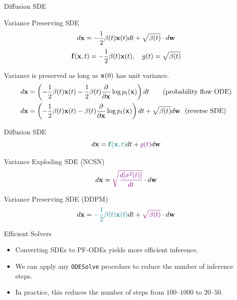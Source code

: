 \documentclass{beamer}
\begin{document}
\begin{frame}{Diffusion SDE}
	\begin{block}{Variance Preserving SDE}
		\vspace{-0.3cm}
		\[
			d \mathbf{x} = - \frac{1}{2} \beta(t) \mathbf{x}(t) dt + \sqrt{\beta(t)} \cdot d \mathbf{w}
		\]
		\[
			\mathbf{f}(\mathbf{x}, t) = - \frac{1}{2} \beta(t) \mathbf{x}(t) , \quad g(t) = \sqrt{\beta(t)} 
		\]
	\end{block}
	Variance is preserved as long as $\mathbf{x}(0)$ has unit variance.
	\begin{align*}
		d\mathbf{x} &= \left(- \frac{1}{2} \beta(t) \mathbf{x}(t) - \frac{1}{2} \beta(t) \frac{\partial}{\partial \mathbf{x}} \log p_t(\mathbf{x}) \right) dt \quad\quad \text{(probability flow ODE)} \\
		d\mathbf{x} &= \left(- \frac{1}{2} \beta(t) \mathbf{x}(t) - \beta(t) \frac{\partial}{\partial \mathbf{x}} \log p_t(\mathbf{x})\right) dt + \sqrt{\beta(t)} d \mathbf{w}\ \ \text{(reverse SDE)}
	\end{align*}
\end{frame}
\begin{frame}{Diffusion SDE}
	\vspace{-0.5cm}
	\[
		d\mathbf{x} = {\color{teal}\mathbf{f}(\mathbf{x}, t)} dt + {\color{violet}g(t)} d \mathbf{w}
	\]
	\vspace{-0.5cm}
	\begin{block}{Variance Exploding SDE (NCSN)}
		\vspace{-0.3cm}
		\[
			d \mathbf{x} = {\color{violet}\sqrt{\frac{ d [\sigma^2(t)]}{dt}}} \cdot d \mathbf{w}
		\]
		\vspace{-0.5cm}
	\end{block}
	\begin{block}{Variance Preserving SDE (DDPM)}
		\vspace{-0.3cm}
		\[
			d \mathbf{x} = {\color{teal}- \frac{1}{2} \beta(t) \mathbf{x}(t)} dt + {\color{violet}\sqrt{\beta(t)}} \cdot d \mathbf{w}
		\]
		\vspace{-0.5cm}
	\end{block}
	\begin{block}{Efficient Solvers}
		\begin{itemize}
		\item Converting SDEs to PF-ODEs yields more efficient inference.
		\item We can apply any \texttt{ODESolve} procedure to reduce the number of inference steps.
		\item In practice, this reduces the number of steps from $100$--$1000$ to $20$--$50$.
		\end{itemize}
	\end{block}
\end{frame}
\end{document}
